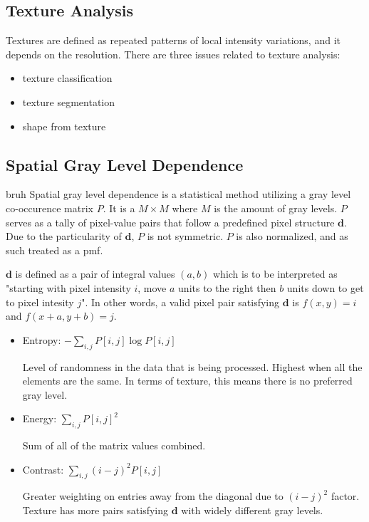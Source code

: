 \documentclass{article}
\begin{document}
\begin{multicols}{3}
\section{Texture Analysis}

Textures are defined as repeated patterns of local intensity variations, and it depends on the resolution. There are three issues related to texture analysis:

\begin{itemize}
  \itemsep0em
  \item {texture classification}
  \item {texture segmentation}
  \item {shape from texture}
\end{itemize}

\subsection{Spatial Gray Level Dependence}
bruh %
Spatial gray level dependence is a statistical method utilizing a gray level co-occurence matrix $P$. It is a $M \times M$ where $M$ is the amount of gray levels. $P$ serves as a tally of pixel-value pairs that follow a predefined pixel structure $\mathbf{d}$. Due to the particularity of $\mathbf{d}$, $P$ is not symmetric. $P$ is also normalized, and as such treated as a pmf.

$\mathbf{d}$ is defined as a pair of integral values $(a,b)$ which is to be interpreted as "starting with pixel intensity $i$, move $a$ units to the right then $b$ units down to get to pixel intesity $j$". In other words, a valid pixel pair satisfying $\mathbf{d}$ is $f(x,y)=i$ and $f(x+a,y+b)=j$.

\begin{itemize}
\itemsep0em
\item Entropy: $-\sum_{i,j} P[i,j] \log P[i,j]$

Level of randomness in the data that is being processed. Highest when all the elements are the same. In terms of texture, this means there is no preferred gray level.

\item Energy:  $\sum_{i,j} P[i,j]^2$

Sum of all of the matrix values combined.

\item Contrast: $\sum_{i,j} (i-j)^2 P[i,j]$

Greater weighting on entries away from the diagonal due to $(i-j)^2$ factor. Texture has more pairs satisfying $\mathbf{d}$ with widely different gray levels.


\end{itemize}
\end{multicols}
\end{document}
